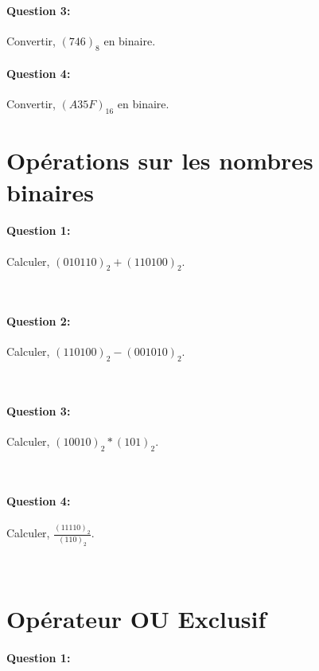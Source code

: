 \paragraph{Question 3:}

Convertir, $(746)_{8}$ en binaire.

\paragraph{Question 4:}

Convertir, $(A35F)_{16}$ en binaire.

\section{Opérations sur les nombres binaires}

\paragraph{Question 1:}

Calculer, $(010110)_{2}+(110100)_{2}$.

~\

\paragraph{Question 2:}

Calculer, $(110100)_{2}-(001010)_{2}$.

~\

\paragraph{Question 3:}

Calculer, $(10010)_{2}*(101)_{2}$.

~\

\paragraph{Question 4:}

Calculer, $\frac{(11110)_{2}}{(110)_{2}}$.

~\

\section{Opérateur OU Exclusif}

\paragraph{Question 1:}

